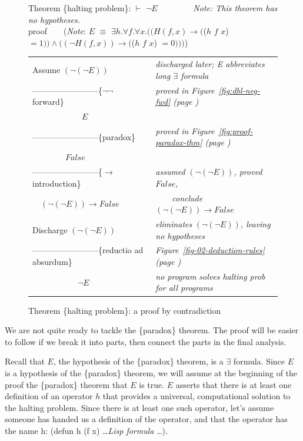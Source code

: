 \begin{figure}
Theorem \{halting problem\}: $\vdash$ $\neg E$ ~~~~~~~~\emph{Note: This theorem has no hypotheses.}\\
proof~~~~(\emph{Note}: $E$ $\equiv$ $\exists h. \forall f. \forall x.
((H(f, x) \rightarrow ($($h$ $f$ $x$) $ = 1)) \wedge ((\neg H(f, x)) \rightarrow ($($h$ $f$ $x$) $= 0)))$)
\begin{center}
\begin{tabular}{ll}
Assume $(\neg(\neg E))$                       &\emph{discharged later; E abbreviates long $\exists$ formula}\\
------------------------\{$\neg \neg$ forward\} &\emph{proved in Figure~\ref{fig:dbl-neg-fwd} (page \pageref{fig:dbl-neg-fwd})}\\
~~~~~~~~~~~~$E$                               &\\
------------------------\{paradox\}           &\emph{proved in Figure~\ref{fig:proof-paradox-thm} (page \pageref{fig:proof-paradox-thm})}\\
~~~~~~~~$False$                               &\\
------------------------\{$\rightarrow$ introduction\} &\emph{assumed} $(\neg(\neg E))$\emph{, proved} $False$\emph{,}\\
~~$(\neg(\neg E)) \rightarrow False$          &~~~~\emph{conclude} $(\neg(\neg E)) \rightarrow False$\\
Discharge $(\neg(\neg E))$                    &\emph{eliminates} $(\neg(\neg E))$\emph{, leaving no hypotheses}\\
------------------------\{reductio ad absurdum\}&\emph{Figure~\ref{fig-02-deduction-rules} (page \pageref{fig-02-deduction-rules})}\\
~~~~~~~~~~~$\neg E$                           &\emph{no program solves halting prob for all programs}\\
\end{tabular}
\end{center}
\caption{Theorem \{halting problem\}: a proof by contradiction}
\label{fig:halting-proof-strategy}
\end{figure}

We are not quite ready to tackle the \{paradox\} theorem.
The proof will be easier to follow if we break it into parts,
then connect the parts in the final analysis.

Recall that $E$, the hypothesis of the \{paradox\} theorem,
is a $\exists$ formula.
Since $E$ is a hypothesis of the \{paradox\} theorem,
we will assume at the beginning of the proof
the \{paradox\} theorem that $E$ is true.
$E$ asserts that there is at least one definition of
an operator $h$ that provides a universal, computational solution
to the halting problem.
Since there is at least one such operator,
let's assume someone has handed us a
definition of the operator, and that the operator has the name h:
(defun h (f x)  \dots \emph{Lisp formula} \dots ).

